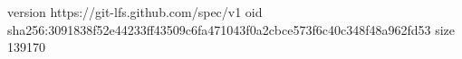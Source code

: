version https://git-lfs.github.com/spec/v1
oid sha256:3091838f52e44233ff43509c6fa471043f0a2cbce573f6c40c348f48a962fd53
size 139170
